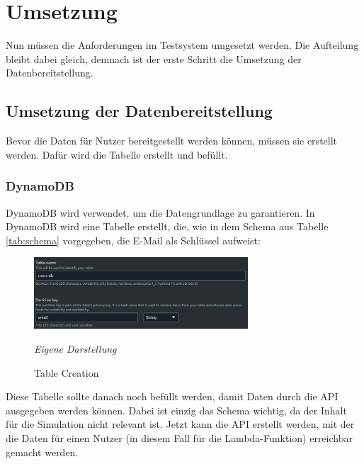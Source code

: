 

\section{Umsetzung}
Nun müssen die Anforderungen im Testsystem umgesetzt werden. Die Aufteilung bleibt dabei gleich, demnach ist der erste Schritt die Umsetzung der Datenbereitstellung.
\subsection{Umsetzung der Datenbereitstellung}
	Bevor die Daten für Nutzer bereitgestellt werden können, müssen sie erstellt werden. Dafür wird die Tabelle erstellt und befüllt.
	\subsubsection{DynamoDB}
	DynamoDB wird verwendet, um die Datengrundlage zu garantieren. In DynamoDB wird eine Tabelle erstellt, die, wie in dem Schema aus Tabelle \ref{tab:schema} vorgegeben, die E-Mail als Schlüssel aufweist:
	\begin{figure}[H]
		\centering
		\begin{minipage}[t]{.7\textwidth} %
		\caption{Table Creation} %
		
		\includegraphics[width = 8cm,keepaspectratio]{tableCreation} \newline
		
		\textit{Eigene Darstellung} %
		\label{fig:tableCreation}
		\end{minipage}
		\end{figure}
	Diese Tabelle sollte danach noch befüllt werden, damit Daten durch die API ausgegeben werden können. Dabei ist einzig das Schema wichtig, da der Inhalt für die Simulation nicht relevant ist. Jetzt kann die API  erstellt werden, mit der die Daten für einen Nutzer (in diesem Fall für die Lambda-Funktion) erreichbar gemacht werden.
